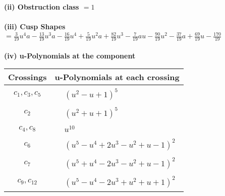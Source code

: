 \documentclass[1p]{elsarticle_modified}
\theoremstyle{definition}
\begin{document}
\flushleft \textbf{(ii) Obstruction class $= 1$}\\~\\
\flushleft \textbf{(iii) Cusp Shapes $= \frac{3}{19} u^4 a-\frac{13}{19} u^3 a-\frac{16}{19} u^4+\frac{5}{19} u^2 a+\frac{82}{19} u^3-\frac{7}{19} a u-\frac{90}{19} u^2-\frac{37}{19} a+\frac{69}{19} u-\frac{170}{19}$}\\~\\
\newpage\renewcommand{\arraystretch}{1}
\flushleft \textbf{(iv) u-Polynomials at the component}\newline \\
\begin{tabular}{m{50pt}|m{274pt}}
Crossings & \hspace{64pt}u-Polynomials at each crossing \\
\hline $$\begin{aligned}c_{1},c_{3},c_{5}\end{aligned}$$&$\begin{aligned}
&(u^2- u+1)^5
\end{aligned}$\\
\hline $$\begin{aligned}c_{2}\end{aligned}$$&$\begin{aligned}
&(u^2+u+1)^5
\end{aligned}$\\
\hline $$\begin{aligned}c_{4},c_{8}\end{aligned}$$&$\begin{aligned}
&u^{10}
\end{aligned}$\\
\hline $$\begin{aligned}c_{6}\end{aligned}$$&$\begin{aligned}
&(u^5- u^4+2 u^3- u^2+u-1)^2
\end{aligned}$\\
\hline $$\begin{aligned}c_{7}\end{aligned}$$&$\begin{aligned}
&(u^5+u^4-2 u^3- u^2+u-1)^2
\end{aligned}$\\
\hline $$\begin{aligned}c_{9},c_{12}\end{aligned}$$&$\begin{aligned}
&(u^5- u^4-2 u^3+u^2+u+1)^2
\end{aligned}$\\

\end{tabular}
\end{document}

